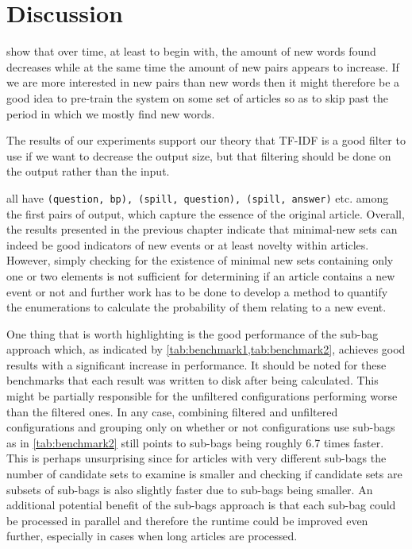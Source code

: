 \chapter{Discussion}
\label{chapter:discussion}

 show that over time, at least to begin with, the amount of new words found decreases while at the same time the amount of new pairs appears to increase. If we are more interested in new pairs than new words then it might therefore be a good idea to pre-train the system on some set of articles so as to skip past the period in which we mostly find new words.

The results of our experiments support our theory that TF-IDF is a good filter to use if we want to decrease the output size, but that filtering should be done on the output rather than the input.

 all have \lstinline{(question, bp), (spill, question), (spill, answer)} etc. among the first pairs of output, which capture the essence of the original article. Overall, the results presented in the previous chapter indicate that minimal-new sets can indeed be good indicators of new events or at least novelty within articles. However, simply checking for the existence of minimal new sets containing only one or two elements is not sufficient for determining if an article contains a new event or not and further work has to be done to develop a method to quantify the enumerations to calculate the probability of them relating to a new event.

One thing that is worth highlighting is the good performance of the sub-bag approach which, as indicated by \cref{tab:benchmark1,tab:benchmark2}, achieves good results with a significant increase in performance. It should be noted for these benchmarks that each result was written to disk after being calculated. This might be partially responsible for the unfiltered configurations performing worse than the filtered ones. In any case, combining filtered and unfiltered configurations and grouping only on whether or not configurations use sub-bags as in \cref{tab:benchmark2} still points to sub-bags being roughly 6.7 times faster. This is perhaps unsurprising since for articles with very different sub-bags the number of candidate sets to examine is smaller and checking if candidate sets are subsets of sub-bags is also slightly faster due to sub-bags being smaller. An additional potential benefit of the sub-bags approach is that each sub-bag could be processed in parallel and therefore the runtime could be improved even further, especially in cases when long articles are processed.

